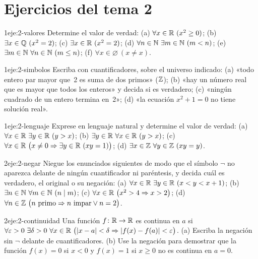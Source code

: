 \section*{Ejercicios del tema 2}

\begin{ejercicio}{1}{eje:2-valores}
Determine el valor de verdad: (a) $\forall x\in\mathbb{R}\ (x^{2}\ge 0)$; (b) $\exists x\in\Q\ (x^{2}=2)$; (c) $\exists x\in\R\ (x^{2}=2)$; (d) $\forall n\in\N\ \exists m\in\N\ (m<n)$; (e) $\exists m\in\mathbb{N}\ \forall n\in\mathbb{N}\ (m\le n)$; (f) $\forall x\in\varnothing\ (x\neq x)$.
\end{ejercicio}

\begin{ejercicio}{1}{eje:2-simbolos}
Escriba con cuantificadores, sobre el universo indicado: (a) «todo entero par mayor que~2 es suma de dos primos» ($\mathbb{Z}$); (b) «hay un número real que es mayor que todos los enteros» y decida si es verdadero; (c) «ningún cuadrado de un entero termina en~2»; (d) «la ecuación $x^{2}+1=0$ no tiene solución real».
\end{ejercicio}

\begin{ejercicio}{1}{eje:2-lenguaje}
Exprese en lenguaje natural y determine el valor de verdad: (a) $\forall x\in\mathbb{R}\ \exists y\in\mathbb{R}\ (y>x)$; (b) $\exists y\in\mathbb{R}\ \forall x\in\mathbb{R}\ (y>x)$; (c) $\forall x\in\mathbb{R}\ \bigl(x\neq 0\Rightarrow\exists y\in\mathbb{R}\ (xy=1)\bigr)$; (d) $\exists x\in\mathbb{Z}\ \forall y\in\mathbb{Z}\ (xy=y)$.
\end{ejercicio}

\begin{ejercicio}{2}{eje:2-negar}
Niegue los enunciados siguientes de modo que el símbolo $\neg$ no aparezca delante de ningún cuantificador ni paréntesis, y decida cuál es verdadero, el original o su negación: (a) $\forall x\in\R\ \exists y\in\R\ (x<y<x+1)$; (b) $\exists n\in\N\ \forall m\in\N\ (n\divides m)$; (c) $\forall x\in\mathbb{R}\ \bigl(x^{2}>4\Rightarrow x>2\bigr)$; (d) $\forall n\in\Z\ \bigl(n\text{ primo}\Rightarrow n\text{ impar}\vee n=2\bigr)$.
\end{ejercicio}

\begin{ejercicio}{2}{eje:2-continuidad}
Una función $f\colon\mathbb{R}\to\mathbb{R}$ es continua en $a$ si $\forall\varepsilon>0\ \exists\delta>0\ \forall x\in\R\ \bigl(\abs{x-a}<\delta\Rightarrow\abs{f(x)-f(a)}<\varepsilon\bigr)$. (a) Escriba la negación sin $\neg$ delante de cuantificadores. (b) Use la negación para demostrar que la función $f(x)=0$ si $x<0$ y $f(x)=1$ si $x\ge 0$ no es continua en $a=0$.
\end{ejercicio}

